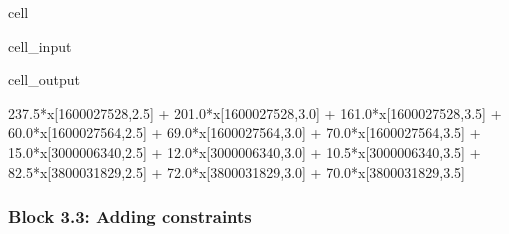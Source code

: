 \documentclass[letterpaper,10pt,english]{jupyterBook}
\begin{document}
\begin{sphinxuseclass}{cell}\begin{sphinxVerbatimInput}

\begin{sphinxuseclass}{cell_input}
\begin{sphinxVerbatim}[commandchars=\\\{\}]

  \PYG{p}{[}\PYG{p}{]}\PYG{p}{[}\PYG{p}{]}\PYG{p}{[}\PYG{p}{]}        
       
\end{sphinxVerbatim}

\end{sphinxuseclass}\end{sphinxVerbatimInput}
\begin{sphinxVerbatimOutput}

\begin{sphinxuseclass}{cell_output}
\begin{sphinxVerbatim}[commandchars=\\\{\}]
237.5*x[1600027528,2.5] + 201.0*x[1600027528,3.0] + 161.0*x[1600027528,3.5] + 60.0*x[1600027564,2.5] + 69.0*x[1600027564,3.0] + 70.0*x[1600027564,3.5] + 15.0*x[3000006340,2.5] + 12.0*x[3000006340,3.0] + 10.5*x[3000006340,3.5] + 82.5*x[3800031829,2.5] + 72.0*x[3800031829,3.0] + 70.0*x[3800031829,3.5]
\end{sphinxVerbatim}

\end{sphinxuseclass}\end{sphinxVerbatimOutput}

\end{sphinxuseclass}

\subsubsection{Block 3.3: Adding constraints}
\label{\detokenize{docs/Case1_5_Module2B_Retail_Price_Optimization_Script:block-3-3-adding-constraints}}
\sphinxAtStartPar
{}
\end{document}
